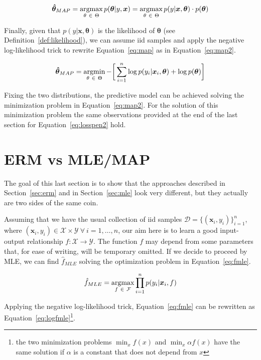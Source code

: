 \begin{equation} \label{eq:map}
	\bm{\hat \theta}_{MAP} = \mathop{\mathrm{argmax}}\limits_{\theta~\in~\Theta} p(\bm{\theta}|y,\bm{x}) = \mathop{\mathrm{argmax}}\limits_{\theta~\in~\Theta} p(y|\bm{x}, \bm{\theta}) \cdot p(\bm{\theta})
\end{equation}

Finally, given that $p(y|\bm{x}, \bm{\theta})$ is the likelihood of $\bm{\theta}$ (see Definition~\ref{def:likelihood}), we can assume \ac{iid} samples and apply the negative log-likelihood trick to rewrite Equation~\eqref{eq:map} as in Equation~\eqref{eq:map2}.

\begin{equation} \label{eq:map2}
	\bm{\hat \theta}_{MAP} = \mathop{\mathrm{argmin}}\limits_{\theta~\in~\Theta} - \bigg[\sum_{i=1}^n \log p(y_i|\bm{x}_i,\bm{\theta})  + \log p(\bm{\theta})\bigg]
\end{equation}

Fixing the two distributions, the predictive model can be achieved solving the minimization problem in Equation~\eqref{eq:map2}. For the solution of this minimization problem the same observations provided at the end of the last section for Equation~\eqref{eq:losspen2} hold.

\section{ERM vs MLE/MAP} \label{sec:erm-mlemap_connection}
The goal of this last section is to show that the approaches described in Section~\ref{sec:erm} and in Section~\ref{sec:mle} look very different, but they actually are two sides of the same coin.

Assuming that we have the usual collection of \ac{iid} samples $\mathcal{D}=\{(\bm{x}_i,y_i)\}_{i=1}^n$, where $(\bm{x}_i,y_i) \in \mathcal{X} \times \mathcal{Y}~\forall~i=1,\dots,n$, our aim here is to learn a good input-output relationship $f: \mathcal{X} \rightarrow \mathcal{Y}$. The function $f$ may depend from some parameters that, for ease of writing, will be temporary omitted. If we decide to proceed by MLE, we can find $\hat f_{MLE}$ solving the optimization problem in Equation~\eqref{eq:fmle}.

\begin{equation} \label{eq:fmle}
	\hat f_{MLE} = \mathop{\mathrm{argmax}}\limits_{f~\in~\mathcal{F}} \prod_{i=1}^n p(y_i|\bm{x}_i,f)
\end{equation}

Applying the negative log-likelihood trick, Equation~\eqref{eq:fmle} can be rewritten as Equation~\eqref{eq:logfmle}\footnote{the two minimization problems $\min_x f(x)$ and $\min_x \alpha f(x)$ have the same solution if $\alpha$ is a constant that does not depend from $x$}.

